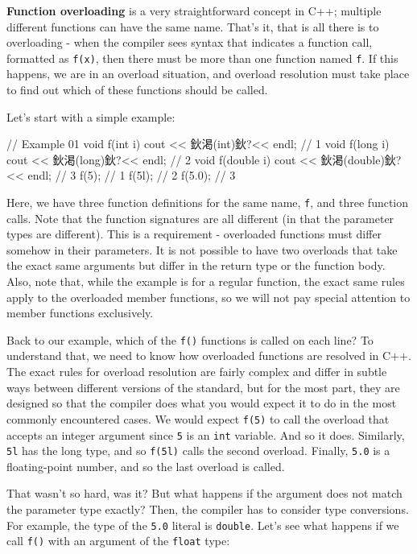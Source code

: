 \textbf{Function overloading} is a very straightforward concept in C++; multiple different functions can have the same name. That's it, that is all there is to overloading - when the compiler sees syntax that indicates a function call, formatted as \texttt{f(x)}, then there must be more than one function named \texttt{f}. If this happens, we are in an overload situation, and overload resolution must take place to find out which of these functions should be called.

Let's start with a simple example:

\begin{code}
// Example 01
void f(int i) { cout << 鈥渇(int)鈥?<< endl; }        // 1
void f(long i) { cout << 鈥渇(long)鈥?<< endl; }    // 2
void f(double i) { cout << 鈥渇(double)鈥?<< endl; }    // 3
f(5);        // 1
f(5l);    // 2
f(5.0);    // 3
\end{code}

Here, we have three function definitions for the same name, \texttt{f}, and three function calls. Note that the function signatures are all different (in that the parameter types are different). This is a requirement - overloaded functions must differ somehow in their parameters. It is not possible to have two overloads that take the exact same arguments but differ in the return type or the function body. Also, note that, while the example is for a regular function, the exact same rules apply to the overloaded member functions, so we will not pay special attention to member functions exclusively.

Back to our example, which of the \texttt{f()} functions is called on each line? To understand that, we need to know how overloaded functions are resolved in C++. The exact rules for overload resolution are fairly complex and differ in subtle ways between different versions of the standard, but for the most part, they are designed so that the compiler does what you would expect it to do in the most commonly encountered cases. We would expect \texttt{f(5)} to call the overload that accepts an integer argument since \texttt{5} is an \texttt{int} variable. And so it does. Similarly, \texttt{5l} has the long type, and so \texttt{f(5l)} calls the second overload. Finally, \texttt{5.0} is a floating-point number, and so the last overload is called.

That wasn't so hard, was it? But what happens if the argument does not match the parameter type exactly? Then, the compiler has to consider type conversions. For example, the type of the \texttt{5.0} literal is \texttt{double}. Let's see what happens if we call \texttt{f()} with an argument of the \texttt{float} type:

